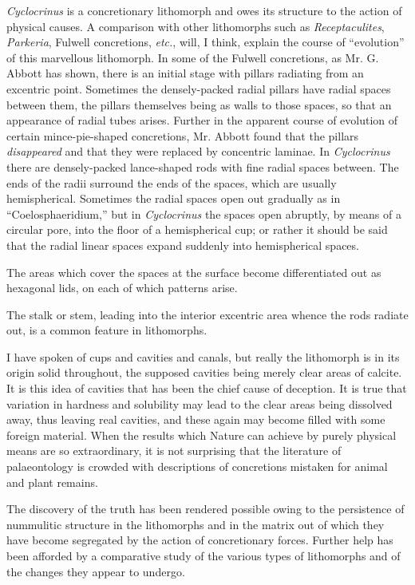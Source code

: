 \documentclass[a4paper, 12pt, oneside]{article}
\begin{document}
\emph{Cyclocrinus} is a concretionary lithomorph and owes its structure to the action of physical causes. A comparison with other lithomorphs such as \emph{Receptaculites}, \emph{Parkeria}, Fulwell concretions, \emph{etc.}, will, I think, explain the course of ``evolution'' of this marvellous lithomorph. In some of the Fulwell concretions, as Mr. G. Abbott has shown, there is an initial stage with pillars radiating from an excentric point. Sometimes the densely-packed radial pillars have radial spaces between them, the pillars themselves being as walls to those spaces, so that an appearance of radial tubes arises. Further in the apparent course of evolution of certain mince-pie-shaped concretions, Mr. Abbott found that the pillars \emph{disappeared} and that they were replaced by concentric laminae. In \emph{Cyclocrinus} there are densely-packed lance-shaped rods with fine radial spaces between. The ends of the radii surround the ends of the spaces, which are usually hemispherical. Sometimes the radial spaces open out gradually as in ``Coelosphaeridium,'' but in \emph{Cyclocrinus} the spaces open abruptly, by means of a circular pore, into the floor of a hemispherical cup; or rather it should be said that the radial linear spaces expand suddenly into hemispherical spaces.

The areas which cover the spaces at the surface become differentiated out as hexagonal lids, on each of which patterns arise.

The stalk or stem, leading into the interior excentric area whence the rods radiate out, is a common feature in lithomorphs.

I have spoken of cups and cavities and canals, but really the lithomorph is in its origin solid throughout, the supposed cavities being merely clear areas of calcite. It is this idea of cavities that has been the chief cause of deception. It is true that variation in hardness and solubility may lead to the clear areas being dissolved away, thus leaving real cavities, and these again may become filled with some foreign material. When the results which Nature can achieve by purely physical means are so extraordinary, it is not surprising that the literature of palaeontology is crowded with descriptions of concretions mistaken for animal and plant remains.

The discovery of the truth has been rendered possible owing to the persistence of nummulitic structure in the lithomorphs and in the matrix out of which they have become segregated by the action of concretionary forces. Further help has been afforded by a comparative study of the various types of lithomorphs and of the changes they appear to undergo.
\end{document}
